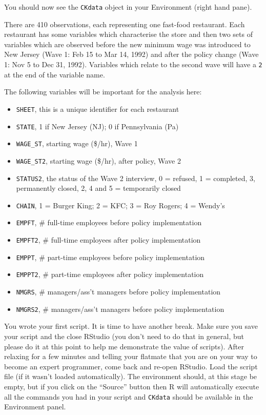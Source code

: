 \documentclass[
]{article}
\providecommand{\tightlist}{%
  \setlength{\itemsep}{0pt}\setlength{\parskip}{0pt}}
\begin{document}
You should now see the \texttt{CKdata} object in your Environment (right
hand pane).

There are 410 observations, each representing one fast-food restaurant.
Each restaurant has some variables which characterise the store and then
two sets of variables which are observed before the new minimum wage was
introduced to New Jersey (Wave 1: Feb 15 to Mar 14, 1992) and after the
policy change (Wave 1: Nov 5 to Dec 31, 1992). Variables which relate to
the second wave will have a \texttt{2} at the end of the variable name.

The following variables will be important for the analysis here:

\begin{itemize}
\tightlist
\item
  \texttt{SHEET}, this is a unique identifier for each restaurant
\item
  \texttt{STATE}, 1 if New Jersey (NJ); 0 if Pennsylvania (Pa)
\item
  \texttt{WAGE\_ST}, starting wage (\$/hr), Wave 1
\item
  \texttt{WAGE\_ST2}, starting wage (\$/hr), after policy, Wave 2
\item
  \texttt{STATUS2}, the status of the Wave 2 interview, 0 = refused, 1 =
  completed, 3, permanently closed, 2, 4 and 5 = temporarily closed
\item
  \texttt{CHAIN}, 1 = Burger King; 2 = KFC; 3 = Roy Rogers; 4 = Wendy's
\item
  \texttt{EMPFT}, \# full-time employees before policy implementation
\item
  \texttt{EMPFT2}, \# full-time employees after policy implementation
\item
  \texttt{EMPPT}, \# part-time employees before policy implementation
\item
  \texttt{EMPPT2}, \# part-time employees after policy implementation
\item
  \texttt{NMGRS}, \# managers/ass't managers before policy
  implementation
\item
  \texttt{NMGRS2}, \# managers/ass't managers before policy
  implementation
\end{itemize}

You wrote your first script. It is time to have another break. Make sure
you save your script and the close RStudio (you don't need to do that in
general, but please do it at this point to help me demonstrate the value
of scripts). After relaxing for a few minutes and telling your flatmate
that you are on your way to become an expert programmer, come back and
re-open RStudio. Load the script file (if it wasn't loaded
automatically). The environment should, at this stage be empty, but if
you click on the ``Source'' button then R will automatically execute all
the commands you had in your script and \texttt{CKdata} should be
available in the Environment panel.
\end{document}
